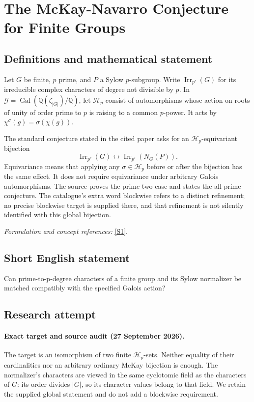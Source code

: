 \documentclass[11pt]{article}
\begin{document}
\section*{\texorpdfstring{The McKay-Navarro Conjecture for Finite Groups}{The McKay-Navarro Conjecture for Finite Groups}}\label{statement}
\subsection{Definitions and mathematical statement}
Let $G$ be finite, $p$ prime, and $P$ a Sylow $p$-subgroup. Write $\operatorname{Irr}_{p'}(G)$ for its irreducible complex characters of degree not divisible by $p$. In $\mathcal G=\operatorname{Gal}({\mathbb{Q}}(\zeta_{|G|})/{\mathbb{Q}})$, let $\mathcal H_p$ consist of automorphisms whose action on roots of unity of order prime to $p$ is raising to a common $p$-power. It acts by $\chi^\sigma(g)=\sigma(\chi(g))$.

The standard conjecture stated in the cited paper asks for an $\mathcal H_p$-equivariant bijection
\[
 \operatorname{Irr}_{p'}(G)\longleftrightarrow
 \operatorname{Irr}_{p'}(N_G(P)).
\]
Equivariance means that applying any $\sigma\in\mathcal H_p$ before or after the bijection has the same effect. It does not require equivariance under arbitrary Galois automorphisms. The source proves the prime-two case and states the all-prime conjecture. The catalogue's extra word blockwise refers to a distinct refinement; no precise blockwise target is supplied there, and that refinement is not silently identified with this global bijection.
\par\smallskip\textit{Formulation and concept references:} \href{https://arxiv.org/abs/2211.14237}{[S1]}.

\subsection{Short English statement}
Can prime-to-p-degree characters of a finite group and its Sylow normalizer be matched compatibly with the specified Galois action?
\subsection{Research attempt}

\paragraph{Exact target and source audit (27 September 2026).}
The target is an isomorphism of two finite $\mathcal H_p$-sets. Neither
equality of their cardinalities nor an arbitrary ordinary McKay bijection
is enough. The normalizer's characters are viewed in the same cyclotomic
field as the characters of $G$: its order divides $|G|$, so its character
values belong to that field. We retain the supplied global statement and
do not add a blockwise requirement.
\end{document}
